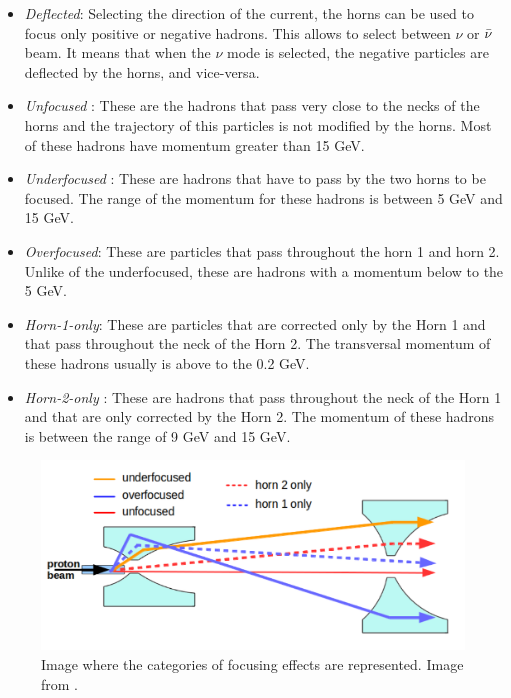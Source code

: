 \begin{itemize}
    \item \textit{Deflected}: Selecting the direction of the current, the horns can be used to focus only positive or negative hadrons. This allows to select between $\nu$ or $\Bar{\nu}$ beam. It means that when the $\nu$ mode is selected, the negative particles are deflected by the horns, and vice-versa.
    \item \textit{Unfocused} : These are the hadrons that pass very close to the necks of the horns and the trajectory of this particles is not modified by the horns. Most of these hadrons have momentum greater than 15 GeV. 
    \item \textit{Underfocused} : These are hadrons that have to pass by the two horns to be focused. The range of the momentum for these hadrons is between 5 GeV and 15 GeV.
    \item \textit{Overfocused}: These are particles that pass throughout the horn 1 and horn 2. Unlike of the underfocused, these are hadrons with a momentum below to the 5 GeV. 
    \item \textit{Horn-1-only}: These are particles that are corrected only by the Horn 1 and that pass throughout the neck of the Horn 2. The transversal momentum of these hadrons usually is above to the 0.2 GeV.
    \item \textit{Horn-2-only} : These are hadrons that pass throughout the neck of the Horn 1 and that are only corrected by the Horn 2. The momentum of these hadrons is between the range of 9 GeV and 15 GeV.
\end{itemize}

\begin{figure}[!htb]
\centering
\includegraphics[scale=0.33]{Figures/Chapter2/FocusingComponents.png}
        \caption{Image where the categories of focusing effects are represented. Image from \cite{LeoThesis}.} 
\label{fig:MnvExp:NuMI:NuMIFocusingComponents}
\end{figure}

